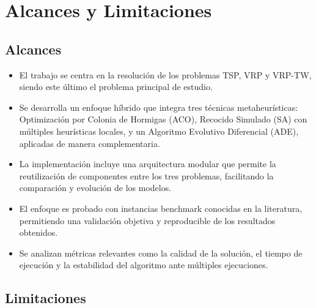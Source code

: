 \documentclass[12pt,titlepage,twoside,openright]{book}
\begin{document}
\section{Alcances y Limitaciones}

\subsection*{Alcances}

\begin{itemize}
	\item El trabajo se centra en la resolución de los problemas TSP, VRP y VRP-TW, siendo este último el problema principal de estudio.

	\item Se desarrolla un enfoque híbrido que integra tres técnicas metaheurísticas: Optimización por Colonia de Hormigas (ACO), Recocido Simulado (SA) con múltiples heurísticas locales, y un Algoritmo Evolutivo Diferencial (ADE), aplicadas de manera complementaria.

	\item La implementación incluye una arquitectura modular que permite la reutilización de componentes entre los tres problemas, facilitando la comparación y evolución de los modelos.

	\item El enfoque es probado con instancias benchmark conocidas en la literatura, permitiendo una validación objetiva y reproducible de los resultados obtenidos.

	\item Se analizan métricas relevantes como la calidad de la solución, el tiempo de ejecución y la estabilidad del algoritmo ante múltiples ejecuciones.
\end{itemize}

\subsection*{Limitaciones}
\end{document}
